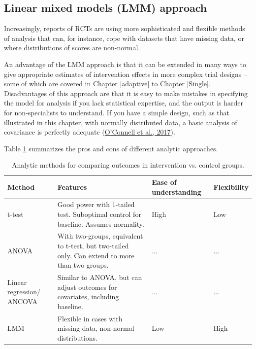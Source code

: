\documentclass{krantz}
\begin{document}
\hypertarget{linear-mixed-models-lmm-approach}{%
\subsection{Linear mixed models (LMM) approach}\label{linear-mixed-models-lmm-approach}}

Increasingly, reports of RCTs are using more sophisticated and flexible methods of analysis that can, for instance, cope with datasets that have missing data, or where distributions of scores are non-normal.

An advantage of the LMM approach is that it can be extended in many ways to give appropriate estimates of intervention effects in more complex trial designs -- some of which are covered in Chapter \ref{adaptive} to Chapter \ref{Single}. Disadvantages of this approach are that it is easy to make mistakes in specifying the model for analysis if you lack statistical expertise, and the output is harder for non-specialists to understand. If you have a simple design, such as that illustrated in this chapter, with normally distributed data, a basic analysis of covariance is perfectly adequate (\protect\hyperlink{ref-oconnell2017}{O'Connell et al., 2017}).

Table \ref{tab:table-procon} summarizes the pros and cons of different analytic approaches.

\begin{table}

\caption{\label{tab:table-procon}Analytic methods for comparing outcomes in intervention vs. control groups.}
\centering
\begin{tabular}[t]{>{\centering\arraybackslash}p{7em}>{\centering\arraybackslash}p{12em}>{\centering\arraybackslash}p{7em}>{\centering\arraybackslash}p{7em}}
\toprule
Method & Features & Ease of understanding & Flexibility\\
\midrule
t-test & Good power with 1-tailed test. 
Suboptimal control for baseline. 
Assumes normality. & High & Low\\
ANOVA & With two-groups, equivalent to t-test, 
but two-tailed only. 
Can extend to more than two groups. & ... & ...\\
Linear regression/ ANCOVA & Similar to ANOVA, but can adjust 
outcomes for covariates, 
including baseline. & ... & ...\\
LMM & Flexible in cases with missing data, 
non-normal distributions. & Low & High\\
\bottomrule
\end{tabular}
\end{table}
\end{document}
